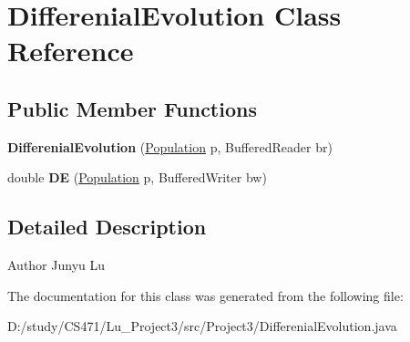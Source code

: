 \hypertarget{class_differenial_evolution}{}\section{Differenial\+Evolution Class Reference}
\label{class_differenial_evolution}
\subsection*{Public Member Functions}
\begin{DoxyCompactItemize}
\item 
\mbox{\label{class_differenial_evolution_a08c99c0d87385473af7a2d62bd0a9604}} 
{\bfseries Differenial\+Evolution} (\mbox{\hyperlink{class_population}{Population}} p, Buffered\+Reader br)
\item 
\mbox{\label{class_differenial_evolution_a8e9512d975b357165fcd0d240c9f8163}} 
double {\bfseries DE} (\mbox{\hyperlink{class_population}{Population}} p, Buffered\+Writer bw)
\end{DoxyCompactItemize}


\subsection{Detailed Description}
\begin{DoxyAuthor}{Author}
Junyu Lu 
\end{DoxyAuthor}


The documentation for this class was generated from the following file\+:\begin{DoxyCompactItemize}
\item 
D\+:/study/\+C\+S471/\+Lu\+\_\+\+Project3/src/\+Project3/Differenial\+Evolution.\+java\end{DoxyCompactItemize}
